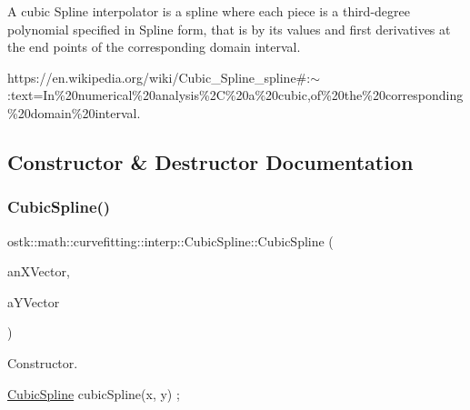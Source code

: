 A cubic Spline interpolator is a spline where each piece is a third-\/degree polynomial specified in Spline form, that is by its values and first derivatives at the end points of the corresponding domain interval.

https\+://en.wikipedia.\+org/wiki/\+Cubic\+\_\+\+Spline\+\_\+spline\#\+:$\sim$\+:text=In\%20numerical\%20analysis\%2C\%20a\%20cubic,of\%20the\%20corresponding\%20domain\%20interval. 

\subsection{Constructor \& Destructor Documentation}
\mbox{\label{classostk_1_1math_1_1curvefitting_1_1interp_1_1_cubic_spline_a6193f35fae4f27ef042c3895f4d1e341}} 
\subsubsection{\texorpdfstring{Cubic\+Spline()}{CubicSpline()}\hspace{0.1cm}{\footnotesize\ttfamily [1/2]}}
{\footnotesize\ttfamily ostk\+::math\+::curvefitting\+::interp\+::\+Cubic\+Spline\+::\+Cubic\+Spline (\begin{DoxyParamCaption}\item[{const Vector\+Xd \&}]{an\+X\+Vector,  }\item[{const Vector\+Xd \&}]{a\+Y\+Vector }\end{DoxyParamCaption})}



Constructor. 


\begin{DoxyCode}
\hyperlink{classostk_1_1math_1_1curvefitting_1_1interp_1_1_cubic_spline_a6193f35fae4f27ef042c3895f4d1e341}{CubicSpline} cubicSpline(x, y) ;
\end{DoxyCode}




